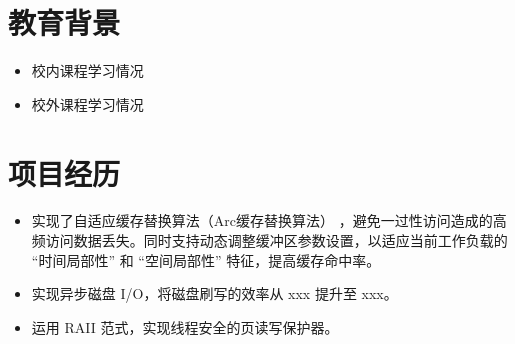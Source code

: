 \documentclass{resume}
\begin{document}




\sepspace
{}


\section{教育背景}
\begin{itemize}
  \item 校内课程学习情况
  \item 校外课程学习情况
\end{itemize}

\section{项目经历}
\begin{itemize}
  \item 实现了自适应缓存替换算法（Arc缓存替换算法） ，避免一过性访问造成的高频访问数据丢失。同时支持动态调整缓冲区参数设置，以适应当前工作负载的 “时间局部性” 和 “空间局部性” 特征，提高缓存命中率。
  \item 实现异步磁盘 I/O，将磁盘刷写的效率从 xxx 提升至 xxx。
  \item 运用 RAII 范式，实现线程安全的页读写保护器。
\end{itemize}
\end{document}
